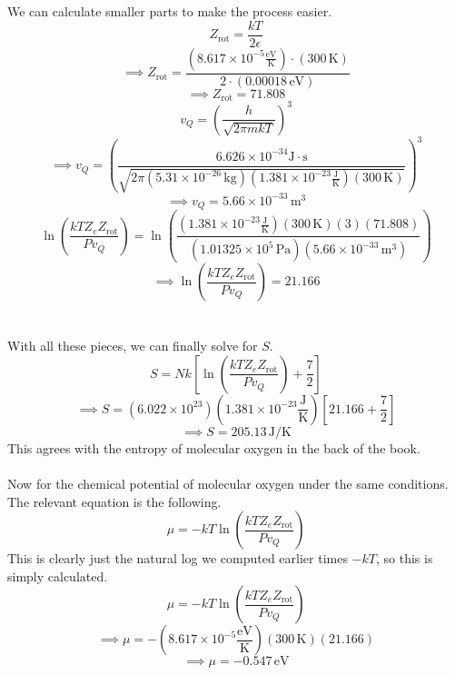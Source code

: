 \documentclass[12pt]{article}
\newcommand{\avogadro}{6.022\times10^{23}}
\newcommand{\boltzmannConstK}{1.381\times10^{-23}\frac{\text{J}}{\text{K}}}
\newcommand{\boltzmannConstInEV}{8.617\times10^{-5}\frac{\text{eV}}{\text{K}}}
\newcommand{\planckConst}{6.626\times10^{-34}\text{J}\cdot\text{s}}
\newcommand{\atmP}{1.01325\times10^5\,\text{Pa}}
\begin{document}
\begin{flushleft}
We can calculate smaller parts to make the process easier.
$$Z_\text{rot}=\frac{kT}{2\epsilon}$$
$$\implies Z_\text{rot}=\frac{(\boltzmannConstInEV)\cdot(300\,\text{K})}{2\cdot(0.00018\,\text{eV})}$$
$$\implies Z_\text{rot}=71.808$$
$$v_Q=\left(\frac{h}{\sqrt{2\pi mkT}}\right)^3$$
$$\implies v_Q=\left(\frac{\planckConst}{\sqrt{2\pi(5.31\times10^{-26}\,\text{kg})(\boltzmannConstK)(300\,\text{K})}}\right)^3$$
$$\implies v_Q=5.66\times10^{-33}\,\text{m}^3$$
$$\ln\left(\frac{kTZ_eZ_\text{rot}}{Pv_Q}\right)=\ln\left(\frac{(\boltzmannConstK)(300\,\text{K})(3)(71.808)}{(\atmP)(5.66\times10^{-33}\,\text{m}^3)}\right)$$
$$\implies\ln\left(\frac{kTZ_eZ_\text{rot}}{Pv_Q}\right)=21.166$$\\~\\

With all these pieces, we can finally solve for $S$.
$$S=Nk\left[\ln\left(\frac{kTZ_eZ_\text{rot}}{Pv_Q}\right)+\frac{7}{2}\right]$$
$$\implies S=(\avogadro)(\boltzmannConstK)\left[21.166+\frac{7}{2}\right]$$
$$\implies S=205.13\,\text{J/K}$$
This agrees with the entropy of molecular oxygen in the back of the book.\\~\\


Now for the chemical potential of molecular oxygen under the same conditions.
The relevant equation is the following.
\begin{equation}
    \mu=-kT\ln\left(\frac{kTZ_eZ_\text{rot}}{Pv_Q}\right)
\end{equation}
This is clearly just the natural log we computed earlier times $-kT$, so this is simply calculated.
$$\mu=-kT\ln\left(\frac{kTZ_eZ_\text{rot}}{Pv_Q}\right)$$
$$\implies\mu=-(\boltzmannConstInEV)(300\,\text{K})(21.166)$$
$$\implies\mu=-0.547\,\text{eV}$$



\end{flushleft}
\end{document}
